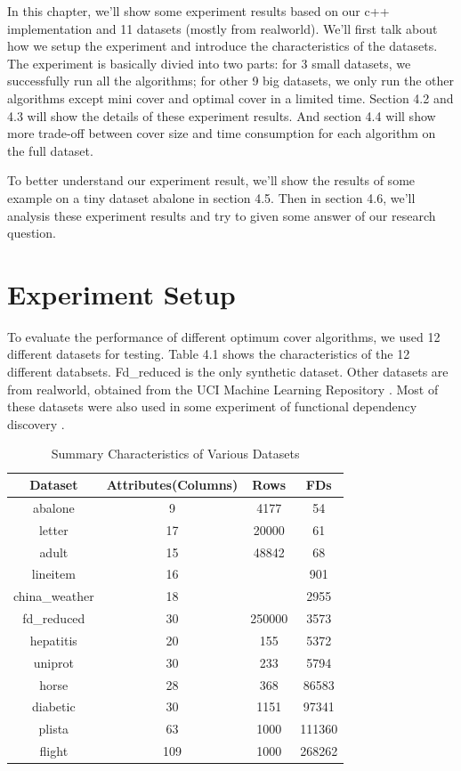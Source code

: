 \documentclass[11pt]{book}
\begin{document}
In this chapter, we'll show some experiment results based on our c++ implementation and 11 datasets (mostly from realworld). We'll first talk about how we setup the experiment and introduce the characteristics of the datasets. The experiment is basically divied into two parts: for 3 small datasets, we successfully run all the algorithms; for other 9 big datasets, we only run the other algorithms except mini cover and optimal cover in a limited time. Section 4.2 and 4.3 will show the details of these experiment results. And section 4.4 will show more trade-off between cover size and time consumption for each algorithm on the full dataset.

To better understand our experiment result, we'll show the results of some example on a tiny dataset abalone in section 4.5. Then in section 4.6, we'll analysis these experiment results and try to given some answer of our research question.

\section{Experiment Setup}
	
To evaluate the performance of different optimum cover algorithms, we used 12 different datasets for testing. Table 4.1 shows the characteristics of the 12 different databsets. Fd\_reduced is the only synthetic dataset. Other datasets are from realworld, obtained from the UCI Machine Learning Repository \cite{asuncion2007uci}. Most of these datasets were also  used in some experiment of functional dependency discovery \cite{papenbrock2015functional}.

\begin{table}

	\centering
	
	\begin{tabular}{ |c|c|c|c| }
		\hline
		Dataset & Attributes(Columns) & Rows & FDs \\
		\hline
		abalone        & 9   & 4177   & 54 \\
		letter         & 17  & 20000  & 61 \\
		adult          & 15  & 48842  & 68 \\
		lineitem       & 16  &        & 901  \\ 
		china\_weather & 18  &        & 2955 \\ 
		fd\_reduced    & 30  & 250000 & 3573 \\
		hepatitis      & 20  & 155    & 5372 \\
		uniprot        & 30  & 233    & 5794 \\
		horse          & 28  & 368    & 86583 \\
		diabetic       & 30  & 1151   & 97341 \\
		plista         & 63  & 1000   & 111360 \\
		flight         & 109 & 1000   & 268262 \\
		\hline
	\end{tabular}

	\caption{Summary Characteristics of Various Datasets}
	
\end{table}
\end{document}

